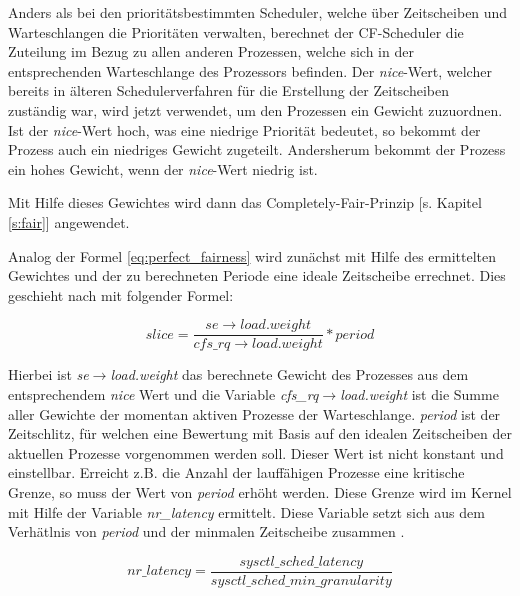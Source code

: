 Anders als bei den prioritäts\-bestim\-mten Scheduler, welche über Zeitscheiben und Warte\-schlan\-gen die Prioritäten verwalten, berechnet der CF-Scheduler die Zuteilung im Bezug zu allen anderen Prozessen, welche sich in der entsprechenden Warteschlange des Prozessors befinden. Der  \textit{nice}-Wert, welcher bereits in älteren Scheduler\-ver\-fahren für die Erstellung der Zeitscheiben zuständig war, wird jetzt verwendet, um den Prozessen ein Gewicht zuzuordnen. Ist der  \textit{nice}-Wert hoch, was eine niedrige Priorität bedeutet, so bekommt der Prozess auch ein niedriges Gewicht zugeteilt. Andersherum bekommt der Prozess ein hohes Gewicht, wenn der  \textit{nice}-Wert niedrig ist.

Mit Hilfe dieses Gewichtes wird dann das  Completely-Fair-Prinzip [s. Kapitel \ref{s:fair}] angewendet. 

Analog der Formel \ref{eq:perfect_fairness} wird zunächst mit Hilfe des ermittelten Gewichtes und der zu berechneten  Periode eine ideale Zeitscheibe errechnet. Dies geschieht nach \cite{paperfairness} mit folgender Formel:  

\begin{equation}
slice = \frac{se\rightarrow load.weight}{cfs\_rq\rightarrow load.weight} * period
\label{eq:slice}
\end{equation}

Hierbei ist \textit{se$\rightarrow$load.weight} das berechnete Gewicht des Prozesses aus dem entsprechendem \textit{nice} Wert und die Variable \textit{cfs\_rq$\rightarrow$load.weight} ist die Summe aller Gewichte der momentan aktiven Prozesse der Warte\-schlan\-ge.
\textit{period} ist der \glqq Zeitschlitz\grqq{}, für welchen eine Bewertung mit Basis auf den idealen Zeitscheiben der aktuellen Prozesse vorgenommen werden soll. Dieser Wert ist nicht konstant und einstellbar. Erreicht z.B. die Anzahl der lauf\-fähigen Prozesse eine kritische Grenze, so muss der Wert von \textit{period} erhöht werden. 
Diese Grenze wird im Kernel mit Hilfe der Variable \textit{nr\_latency} ermittelt. Diese Variable setzt sich aus dem Verhätlnis von \textit{period} und der minmalen Zeitscheibe zusammen \cite{paperfairness}.

\begin{equation}
nr\_latency = \frac{sysctl\_sched\_latency}{sysctl\_sched\_min\_granularity}
\label{eq:nr_latency}
\end{equation}

